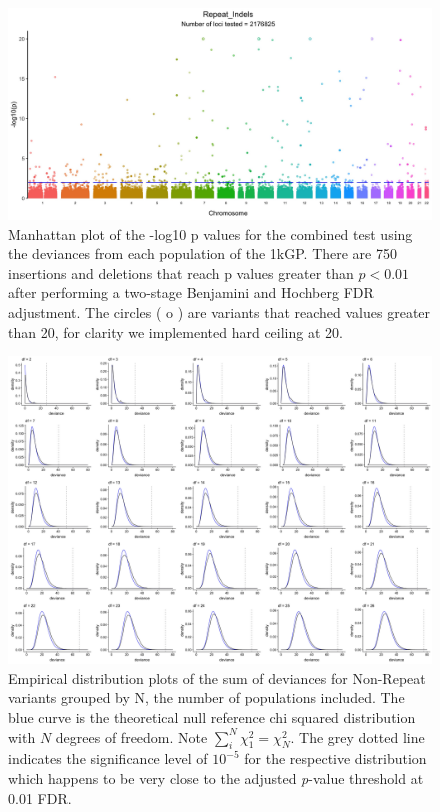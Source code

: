 \documentclass[9pt,lineno]{elife}
\begin{document}
\begin{figure}[h]
\includegraphics[width=\hsize,keepaspectratio]{./Figures/ManhattanPlot_Repeat_Indels.jpg}

\caption{Manhattan plot of the -log10 p values for the combined test using the deviances from each population of the 1kGP. 
There are 750 insertions and deletions that reach p values greater than $ p < 0.01$ after performing a two-stage Benjamini and Hochberg FDR adjustment. 
The circles ( o ) are variants that reached values greater than 20, for clarity we implemented hard ceiling at 20.}
 \label{RI_Manhattan}
\end{figure}

\begin{figure}[h]
\includegraphics[width=\hsize,keepaspectratio]{./Figures/AllDeviances.jpg}

\caption{Empirical distribution plots of the sum of deviances for Non-Repeat variants grouped by N, the number of populations included. The blue curve is the theoretical null reference chi squared distribution with $N$ degrees of freedom. Note $\sum_i^N  \chi^2_1= \chi^2_N$. The grey dotted line indicates the significance level of $10^{-5}$ for the respective distribution which happens to be very close to the adjusted \textit{p}-value threshold at 0.01 FDR. }
\label{Deviances}
\end{figure}
\end{document}
